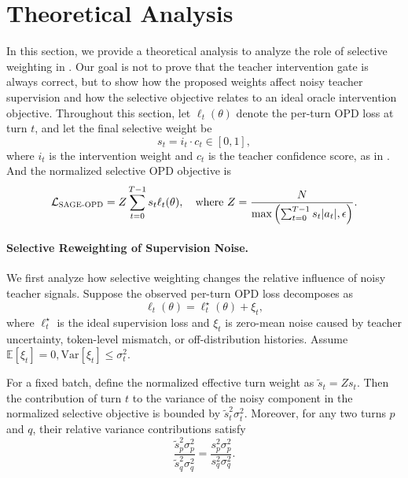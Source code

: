 \section{Theoretical Analysis}
\label{sec:theory}
In this section, we provide a theoretical analysis to analyze the role of selective weighting in \ours.
%
Our goal is not to prove that the teacher intervention gate is always correct, but to show how the proposed weights affect noisy teacher supervision and how the selective objective relates to an ideal oracle intervention objective.
%
Throughout this section, let $\ell_t(\theta)$ denote the per-turn OPD loss at turn $t$, and let the final selective weight be
\begin{equation}
    s_t = i_t \cdot c_t \in [0,1],
\end{equation}
where $i_t$ is the intervention weight and $c_t$ is the teacher confidence score, as in .
%
And the normalized selective OPD objective is
\begin{equation}
    \mathcal{L}_{\textsc{SAGE-OPD}}
    =
    Z
    \sum_{t=0}^{T-1}
    s_t \ell_t(\theta),
    \quad
    \mathrm{where~}
    Z =
    \frac{N}{
    \max\left(
    \sum_{t=0}^{T-1} s_t |a_t|,
    \epsilon
    \right)
    }.
\end{equation}

\paragraph{Selective Reweighting of Supervision Noise.}
We first analyze how selective weighting changes the relative influence of noisy teacher signals.
%
Suppose the observed per-turn OPD loss decomposes as
\begin{equation}
    \ell_t(\theta)
    =
    \ell_t^\star(\theta) + \xi_t,
\end{equation}
where $\ell_t^\star$ is the ideal supervision loss and $\xi_t$ is zero-mean noise caused by teacher uncertainty, token-level mismatch, or off-distribution histories.
%
Assume
$
    \mathbb{E}[\xi_t]=0,
    \mathrm{Var}[\xi_t]\leq \sigma_t^2$.

\begin{proposition}
For a fixed batch, define the normalized effective turn weight as
$
    \widetilde{s}_t = Zs_t$.
Then the contribution of turn $t$ to the variance of the noisy component in the normalized selective objective is bounded by
$
    \widetilde{s}_t^2 \sigma_t^2$.
Moreover, for any two turns $p$ and $q$, their relative variance contributions satisfy
\begin{equation}
    \frac{\widetilde{s}_p^2 \sigma_p^2}
         {\widetilde{s}_q^2 \sigma_q^2}
    =
    \frac{s_p^2 \sigma_p^2}
         {s_q^2 \sigma_q^2}.
\end{equation}
\end{proposition}

